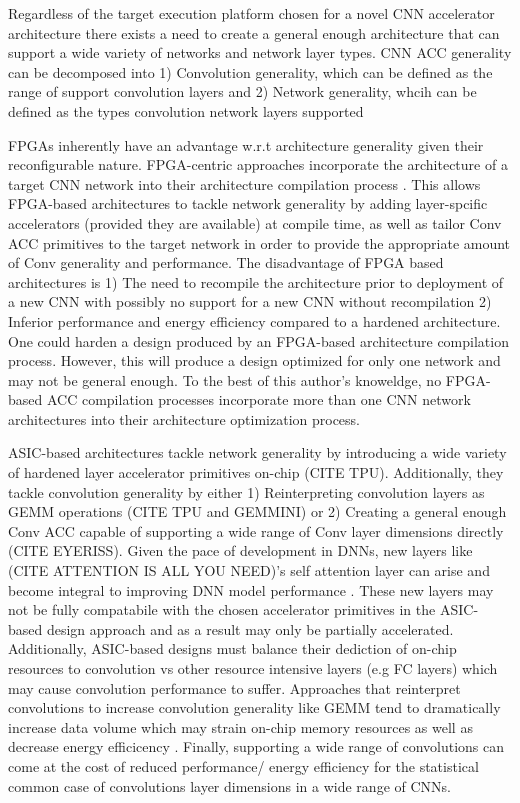Regardless of the target execution platform chosen for a novel \ac{CNN}
accelerator architecture there exists a need to create a general enough
architecture that can support a wide variety of networks and network layer
types. \ac{CNN} \ac{ACC} generality can be decomposed into 1) Convolution
generality, which can be defined as the range of support convolution layers and
2) Network generality, whcih can be defined as the types convolution network
layers supported 

\ac{FPGA}s inherently have an advantage w.r.t architecture generality given
their reconfigurable nature. \ac{FPGA}-centric approaches incorporate the
architecture of a target \ac{CNN} network into their architecture compilation
process \cite{caffeine}. This allows \ac{FPGA}-based architectures to tackle
network generality by adding layer-spcific accelerators (provided they are
available) at compile time, as well as tailor \ac{Conv} \ac{ACC} primitives to
the target network in order to provide the appropriate amount of \ac{Conv}
generality and performance. The disadvantage of \ac{FPGA} based architectures is
1) The need to recompile the architecture prior to deployment of a new \ac{CNN}
with possibly no support for a new \ac{CNN} without recompilation 2) Inferior performance and energy
efficiency compared to a hardened architecture. One could harden a design
produced by an \ac{FPGA}-based architecture compilation process. However, this
will produce a design optimized for only one network and may not be general
enough. To the best of this author's knoweldge, no \ac{FPGA}-based \ac{ACC}
compilation processes incorporate more than one \ac{CNN} network architectures
into their architecture optimization process. 

\ac{ASIC}-based architectures tackle network generality by introducing a wide
variety of hardened layer accelerator primitives on-chip (CITE TPU).
Additionally, they tackle convolution generality by either 1) Reinterpreting
convolution layers as \ac{GEMM} operations (CITE TPU and GEMMINI) or 2) Creating a general
enough \ac{Conv} \ac{ACC} capable of supporting a wide range of \ac{Conv} layer
dimensions directly (CITE EYERISS). Given the pace of development in \ac{DNN}s,
new layers like (CITE ATTENTION IS ALL YOU NEED)'s self attention layer can
arise and become integral to improving \ac{DNN} model performance
\cite{conv_and_transformers}. These new layers may not be fully compatabile with
the chosen accelerator primitives in the \ac{ASIC}-based design approach and as
a result may only be partially accelerated. Additionally, \ac{ASIC}-based
designs must balance their dediction of on-chip resources to convolution vs
other resource intensive layers (e.g \ac{FC} layers) which may cause convolution
performance to suffer. Approaches that reinterpret convolutions to increase
convolution generality like \ac{GEMM} tend to dramatically increase data volume
which may strain on-chip memory resources as well as decrease energy efficicency
\cite{caffeine}. Finally, supporting a wide range of convolutions can come at
the cost of reduced performance/ energy efficiency for the statistical common
case of convolutions layer dimensions in a wide range of \ac{CNN}s.  


